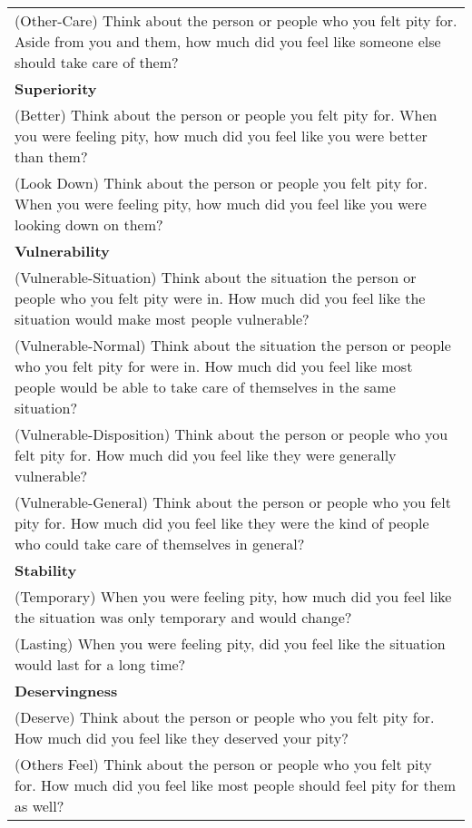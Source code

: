 \documentclass[man]{apa6}
\begin{document}
\begin{longtable}{p{16cm}}
\hspace{1cm}(Other-Care) Think about the person or people who you felt pity for. Aside from you and them, how much did you feel like someone else should take care of them? \\
\textbf{Superiority} \\
\hspace{1cm}(Better) Think about the person or people you felt pity for. When you were feeling pity, how much did you feel like you were better than them? \\
\hspace{1cm}(Look Down) Think about the person or people you felt pity for. When you were feeling pity, how much did you feel like you were looking down on them? \\
\textbf{Vulnerability} \\
\hspace{1cm}(Vulnerable-Situation) Think about the situation the person or people who you felt pity were in. How much did you feel like the situation would make most people vulnerable? \\
\hspace{1cm}(Vulnerable-Normal) Think about the situation the person or people who you felt pity for were in. How much did you feel like most people would be able to take care of themselves in the same situation? \\
\hspace{1cm}(Vulnerable-Disposition) Think about the person or people who you felt pity for. How much did you feel like they were generally vulnerable? \\
\hspace{1cm}(Vulnerable-General) Think about the person or people who you felt pity for. How much did you feel like they were the kind of people who could take care of themselves in general? \\
\textbf{Stability} \\
\hspace{1cm}(Temporary) When you were feeling pity, how much did you feel like the situation was only temporary and would change? \\
\hspace{1cm}(Lasting) When you were feeling pity, did you feel like the situation would last for a long time? \\
\textbf{Deservingness} \\
\hspace{1cm}(Deserve) Think about the person or people who you felt pity for. How much did you feel like they deserved your pity? \\
\hspace{1cm}(Others Feel) Think about the person or people who you felt pity for. How much did you feel like most people should feel pity for them as well? \\
\end{longtable}
\newpage
\end{document}
